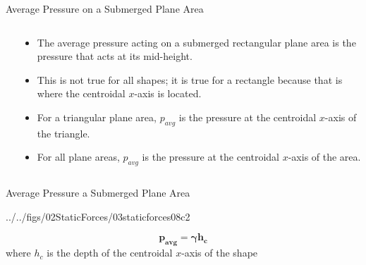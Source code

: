 \documentclass[9pt,xcolor={svgnames, x11names},professionalfonts, mathserif]{beamer}
\begin{document}
\begin{frame}{Average Pressure on a Submerged Plane Area}
 \begin{columns}
  \begin{column}{0.45\textwidth}
  \end{column}
  \begin{column}{0.5\textwidth}
   \begin{itemize}
    \item The average pressure acting on a submerged rectangular plane area is the pressure that acts at its mid-height. \pause
    \item This is not true for all shapes; it is true for a rectangle because that is where the centroidal $x$-axis is located.  \pause
    \item For a triangular plane area, $p_{avg}$ is the pressure at the   centroidal $x$-axis of the triangle.  \pause
    \item For all plane areas, $p_{avg}$ is the pressure at the   centroidal $x$-axis of the area. \end{itemize}
    \end{column}
    \end{columns}
    
    \end{frame}
    
    \begin{frame}{Average Pressure a Submerged Plane Area}
     \centering
     \begin{cfig}[0.55]{../../figs/02StaticForces/03staticforces08c2}\end{cfig}
     \begin{mybox}[width=10cm, title=Average Pressure on a Submerged Plane Area]
      
      $$\bm{ p_{avg} = \gamma h_c }$$
      \centering
      where $h_c$ is the depth of the centroidal $x$-axis of the shape
      
     \end{mybox}
    \end{frame}
    
\end{document}

